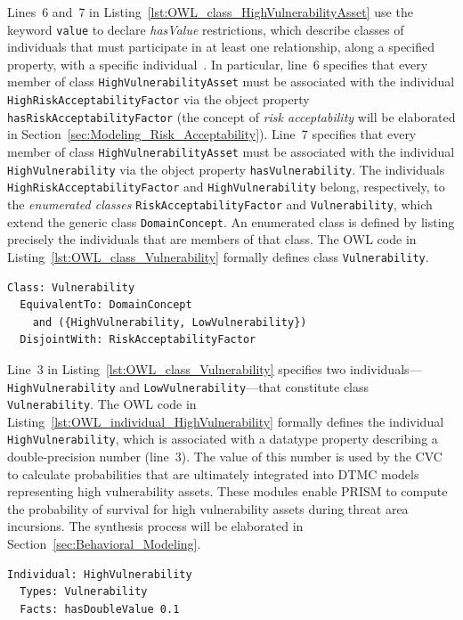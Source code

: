 Lines~6 and~7 in Listing~\ref{lst:OWL_class_HighVulnerabilityAsset} use the keyword \texttt{value} to declare \emph{hasValue} restrictions, which describe classes of individuals that must participate in at least one relationship, along a specified property, with a specific individual~\cite{Horridge_2011}. In particular, line~6 specifies that every member of class \texttt{HighVulnerabilityAsset} must be associated with the individual \texttt{HighRiskAcceptabilityFactor} via the object property \texttt{hasRiskAcceptability\-Factor} (the concept of \emph{risk acceptability} will be elaborated in Section~\ref{sec:Modeling_Risk_Acceptability}). Line~7 specifies that every member of class \texttt{HighVulnerabilityAsset} must be associated with the individual \texttt{HighVulnerability} via the object property \texttt{hasVulnerability}. The individuals \texttt{HighRiskAcceptabilityFactor} and \texttt{HighVulnerability} belong, respectively, to the \emph{enumerated classes} \texttt{RiskAcceptabilityFactor} and \texttt{Vulnerability}, which extend the generic class \texttt{DomainConcept}. An enumerated class is defined by listing precisely the individuals that are members of that class. The OWL code in Listing~\ref{lst:OWL_class_Vulnerability} formally defines class \texttt{Vulnerability}.

\begin{lstlisting}[caption={OWL code for class \texttt{Vulnerability}},label=lst:OWL_class_Vulnerability]
Class: Vulnerability
  EquivalentTo: DomainConcept
    and ({HighVulnerability, LowVulnerability})
  DisjointWith: RiskAcceptabilityFactor
\end{lstlisting}

Line~3 in Listing~\ref{lst:OWL_class_Vulnerability} specifies two individuals---\texttt{HighVulnerability} and \texttt{LowVul\-nerability}---that constitute class \texttt{Vulnerability}. The OWL code in Listing~\ref{lst:OWL_individual_HighVulnerability} formally defines the individual \texttt{HighVulnerability}, which is associated with a datatype property describing a double-precision number (line~3). The value of this number is used by the CVC to calculate probabilities that are ultimately integrated into DTMC models representing high vulnerability assets. These modules enable PRISM to compute the probability of survival for high vulnerability assets during threat area incursions. The synthesis process will be elaborated in Section~\ref{sec:Behavioral_Modeling}.

\begin{lstlisting}[caption={OWL code for the individual \texttt{HighVulnerability}},label=lst:OWL_individual_HighVulnerability]
Individual: HighVulnerability
  Types: Vulnerability
  Facts: hasDoubleValue 0.1
\end{lstlisting}

